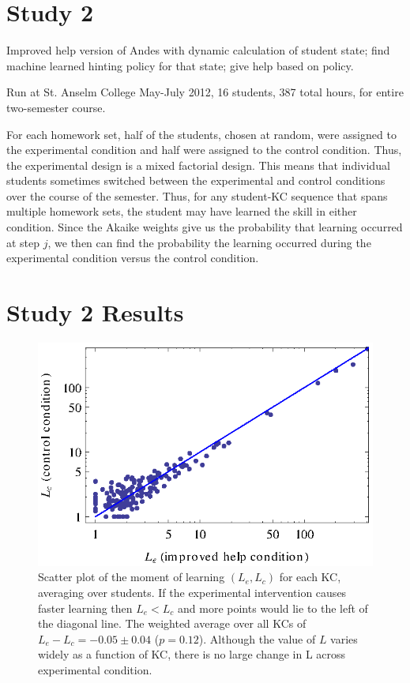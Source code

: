 \documentclass{edm_template}
\begin{document}
\section{Study 2}

Improved help version of Andes with dynamic calculation of student state; find machine learned hinting policy for that state; give help based on policy.


Run at St. Anselm College May-July 2012, 16 students, 387 total hours, 
for entire two-semester course.  


For each homework set, half of the students, chosen at random, were
assigned to the experimental condition and half were assigned to
the control condition.  Thus, the experimental design is a mixed 
factorial design.
This means that individual students sometimes switched
between the experimental and control conditions over the course of the
semester.  Thus, for any student-KC sequence that spans multiple
homework sets, the student may have learned the skill in either 
condition.  Since the Akaike weights  give us the probability that 
learning occurred at step $j$, we then can find the probability 
the learning occurred
during the experimental condition versus the control condition.


\section{Study 2 Results}
%
%

\begin{figure}
   \centering\includegraphics{scatter-step.eps}
   \caption{Scatter plot of the moment of learning $(L_e,L_c)$ for each
     KC, averaging over students.  If the experimental intervention causes
     faster learning then $L_e<L_c$ and more points would lie to the 
     left of the diagonal line.
     The weighted average over all KCs of $L_e-L_c = -0.05\pm 0.04$ ($p=0.12$).
     Although the value of $L$ varies widely as a function of KC, there
     is no large change in L across experimental condition.
   }\label{scatterstep}
\end{figure}
\end{document}
